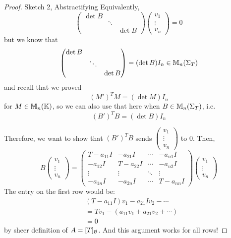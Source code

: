 \begin{proof} {Sketch 2, Abstractifying}
    Equivalently, \[
        \begin{pmatrix}
            \det B &        &        \\
                   & \ddots &        \\
                   &        & \det B
        \end{pmatrix} \begin{pmatrix}
            v_1    \\
            \vdots \\
            v_n
        \end{pmatrix} = 0
    \]
    but we know that \[
        \begin{pmatrix}
            \det B &        &        \\
                   & \ddots &        \\
                   &        & \det B
        \end{pmatrix} = (\det B) I_n \in \mathbb{M}_n(\Sigma_T)
    \]
    and recall that we proved \[
        (M')^T M = (\det M) I_n
    \]
    for \(M  \in \mathbb{M}_n(\mathbb{K})\), so we can also use that here when \(B \in \mathbb{M}_n(\Sigma_T)\), i.e.
    \[
        (B')^T B = (\det B )I_n
    \]

    Therefore, we want to show that \((B')^T B\) sends \(\begin{pmatrix}
        v_1    \\
        \vdots \\
        v_n
    \end{pmatrix}\) to 0. Then,
    \[
        B \begin{pmatrix}
            v_1    \\
            \vdots \\
            v_n
        \end{pmatrix} = \begin{pmatrix}
            T - a_{11}I & -a_{21}I    & \cdots & -a_{n1}I  \\
            -a_{12}I    & T - a_{22}I & \cdots & -a_{n2}I  \\
            \vdots      & \vdots      & \ddots & \vdots    \\
            -a_{1n}I    & -a_{2n}I    & \cdots & T-a_{nn}I
        \end{pmatrix}\begin{pmatrix}
            v_1    \\
            \vdots \\
            v_n
        \end{pmatrix}
    \]
    The entry on the first row would be: \begin{align*}
         & (T - a_{11}I) v_1 - a_{21}Iv_2 - \cdots   \\
         & = Tv_1 - (a_{11}v_1 + a_{21}v_2 + \cdots) \\
         & = 0
    \end{align*}
    by sheer definition of \(A = [T]_{\mathcal{B}}\). And this argument works for all rows!
\end{proof}
